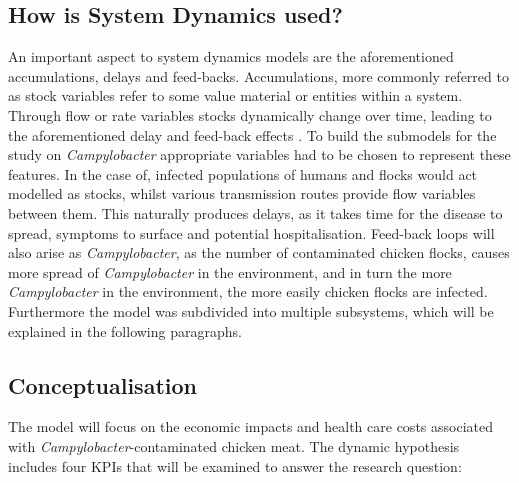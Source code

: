 \subsection{How is System Dynamics used?}
An important aspect to system dynamics models are the aforementioned accumulations, delays and feed-backs. Accumulations, more commonly referred to as stock variables refer to some value material or entities within a system. Through flow or rate variables stocks dynamically change over time, leading to the aforementioned delay and feed-back effects \parencite{sterman_system_2001}. To build the submodels for the study on \textit{Campylobacter} appropriate variables had to be chosen to represent these features. In the case of, infected populations of humans and flocks would act modelled as stocks, whilst various transmission routes provide flow variables between them. This naturally produces delays, as it takes time for the disease to spread, symptoms to surface and potential hospitalisation. Feed-back loops will also arise as \textit{Campylobacter}, as the number of contaminated chicken flocks, causes more spread of \textit{Campylobacter} in the environment, and in turn the more \textit{Campylobacter} in the environment, the more easily chicken flocks are infected. Furthermore the model was subdivided into multiple subsystems, which will be explained in the following paragraphs. 


\subsection{Conceptualisation}
The model will focus on the economic impacts and health care costs associated with \textit{Campylobacter}-contaminated chicken meat. 
The dynamic hypothesis includes four KPIs that will be examined to answer the research question: 

